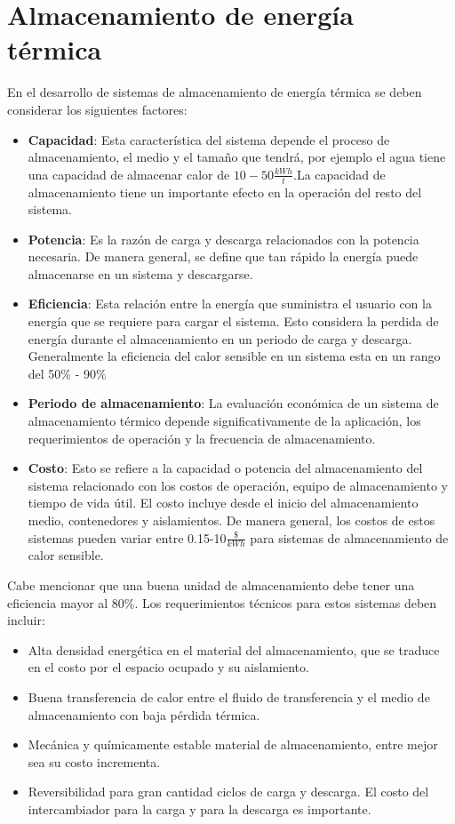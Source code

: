 \section{Almacenamiento de energ\'ia t\'ermica}
En el desarrollo de sistemas de almacenamiento de energ\'ia t\'ermica se deben considerar los siguientes factores:
\begin{itemize}
	\item \textbf{Capacidad}: Esta característica del sistema depende el proceso de almacenamiento, el medio y el tama\~no que tendrá, por ejemplo el agua tiene una capacidad de almacenar calor de $10-50 \frac{kWh}{t}$.La capacidad de almacenamiento tiene un importante efecto en la operación del resto del sistema.
	\item \textbf{Potencia}: Es la raz\'on de carga y descarga relacionados con la potencia necesaria. De manera general, se define que tan r\'apido la energ\'ia puede almacenarse en un sistema y descargarse.
	\item \textbf{Eficiencia}: Esta relaci\'on entre la energ\'ia que suministra el usuario con la energ\'ia que se requiere para cargar el sistema. Esto considera la perdida de energ\'ia durante el almacenamiento en un periodo de carga y descarga. Generalmente la eficiencia del calor sensible en un sistema esta en un rango del 50$\%$ - 90$\%$
	\item \textbf{Periodo de almacenamiento}: La evaluaci\'on económica de un sistema de almacenamiento t\'ermico depende significativamente de la aplicaci\'on, los requerimientos de operaci\'on y la frecuencia de almacenamiento.
	\item \textbf{Costo}: Esto se refiere a la capacidad o potencia del almacenamiento del sistema relacionado con los costos de operaci\'on, equipo de almacenamiento y tiempo de vida \'util. El costo incluye desde el inicio del almacenamiento medio, contenedores y aislamientos. De manera general, los costos de estos sistemas pueden variar entre 0.15-10$\frac{\$}{kWh}$ para sistemas de almacenamiento de calor sensible.
\end{itemize}
Cabe mencionar que una buena unidad de almacenamiento debe tener una eficiencia mayor al 80$\%$. Los requerimientos t\'ecnicos para estos sistemas deben incluir:
\begin{itemize}
	\item Alta densidad energ\'etica en el material del almacenamiento, que se traduce en el costo por el espacio ocupado y su aislamiento.
	\item Buena transferencia de calor entre el fluido de transferencia y el medio de almacenamiento con baja p\'erdida t\'ermica.
	\item Mec\'anica y qu\'imicamente estable material de almacenamiento, entre mejor sea su costo incrementa.
	\item Reversibilidad para gran cantidad ciclos de carga y descarga. El costo del intercambiador para la carga y para la descarga es importante\cite{Yatish2017}.
\end{itemize}

